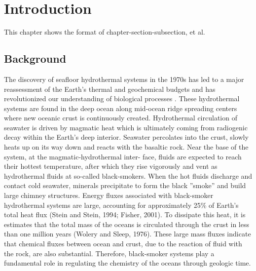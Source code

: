 
\chapter{Introduction}
\label{chapter:Introduction}

This chapter shows the format of chapter-section-subsection, et al.

\section{Background}
The discovery of seafloor hydrothermal systems in the 1970s has led to
a major reassessment of the Earth’s thermal and geochemical budgets and has revolutionized
our understanding of biological processes .   These
hydrothermal systems are found in the deep ocean along mid-ocean ridge spreading centers
where new oceanic crust is continuously created.   Hydrothermal circulation of seawater is
driven by magmatic heat which is ultimately coming from radiogenic decay within the Earth’s
deep interior. Seawater percolates into the crust, slowly heats up on its way down and reacts
with the basaltic rock.   Near the base of the system, at the magmatic-hydrothermal inter-
face, fluids are expected to reach their hottest temperature, after which they rise vigorously
and vent as hydrothermal fluids at so-called black-smokers.   When the hot fluids discharge
and contact cold seawater, minerals precipitate to form the black ”smoke” and build large
chimney structures.
Energy fluxes associated with black-smoker hydrothermal systems are large, accounting
for approximately 25\% of Earth’s total heat flux (Stein and Stein, 1994; Fisher, 2001).   To
dissipate this heat, it is estimates that the total mass of the oceans is circulated through
the crust in less than one million years (Wolery and Sleep, 1976).   These large mass fluxes
indicate   that chemical   fluxes   between   ocean and   crust,   due   to  the   reaction  of   fluid   with
the rock, are also substantial.   Therefore, black-smoker systems play a fundamental role in
regulating the chemistry of the oceans through geologic time.



